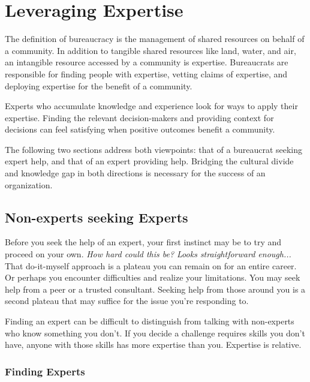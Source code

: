 \section{Leveraging Expertise\label{sec:expertise}}


The definition of \gls{bureaucracy} is the management of shared resources on behalf of a community. In addition to tangible shared resources like land, water, and air, an intangible resource accessed by a community is expertise. Bureaucrats are responsible for finding people with expertise, vetting claims of expertise, and deploying expertise for the benefit of a community. 

Experts who accumulate knowledge and experience look for ways to apply their expertise. Finding the relevant decision-makers and providing context for decisions can feel satisfying when positive  outcomes benefit a community. 


The following two sections address both viewpoints: that of a bureaucrat seeking expert help, and that of an expert providing help. Bridging the cultural divide and knowledge gap in both directions is necessary for the success of an organization.

\subsection*{Non-experts seeking Experts}

Before you seek the help of an expert, your first instinct may be to try and proceed on your own. \textit{How hard could this be? Looks straightforward enough...} That do-it-myself approach is a plateau you can remain on for an entire career. Or perhaps you encounter difficulties and realize your limitations. You may seek help from a peer or a trusted consultant. Seeking help from those around you is a second plateau that may suffice for the issue you're responding to. 

Finding an expert can be difficult to distinguish from talking with non-experts who know something you don't. If you decide a challenge requires skills you don't have, anyone with those skills has more expertise than you. Expertise is relative. 

\subsubsection*{Finding Experts}

